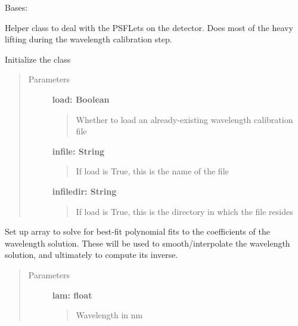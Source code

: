 \documentclass[letterpaper,10pt,english]{sphinxmanual}
\begin{document}
\begin{fulllineitems}
\label{tools:tools.locate_psflets.PSFLets}
Bases: \href{https://docs.python.org/2/library/functions.html\#object}{}

Helper class to deal with the PSFLets on the detector. Does most of the heavy lifting
during the wavelength calibration step.

Initialize the class
\begin{quote}\begin{description}
\item[{Parameters}] \leavevmode
\textbf{load: Boolean}
\begin{quote}

Whether to load an already-existing wavelength calibration file
\end{quote}

\textbf{infile: String}
\begin{quote}

If load is True, this is the name of the file
\end{quote}

\textbf{infiledir: String}
\begin{quote}

If load is True, this is the directory in which the file resides
\end{quote}

\end{description}\end{quote}

\begin{fulllineitems}
\label{tools:tools.locate_psflets.PSFLets.geninterparray}
Set up array to solve for best-fit polynomial fits to the
coefficients of the wavelength solution.  These will be used
to smooth/interpolate the wavelength solution, and
ultimately to compute its inverse.
\begin{quote}\begin{description}
\item[{Parameters}] \leavevmode
\textbf{lam: float}
\begin{quote}

Wavelength in nm
\end{quote}


\end{description}
\end{quote}
\end{fulllineitems}
\end{fulllineitems}
\end{document}
